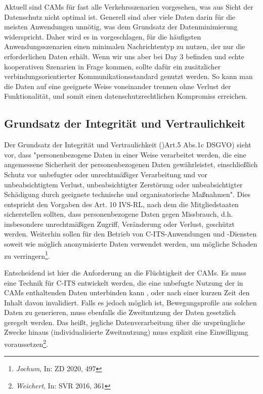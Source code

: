 Aktuell sind CAMs für fast alle Verkehrsszenarien vorgesehen, was aus Sicht der Datenschutz nicht optimal ist. Generell sind aber viele Daten darin für die meisten Anwendungen unnötig, was dem Grundsatz der Datenminimierung widerspricht. Daher wird es in \cite{Kiometzis2017} vorgeschlagen, für die häufigsten Anwendungsszenarien einen minimalen Nachrichtentyp zu nutzen, der nur die erforderlichen Daten erhält. Wenn wir uns aber bei Day 3 befinden und echte kooperativen Szenarien in Frage kommen, sollte dafür ein zusätzlicher verbindungsorientierter Kommunikationsstandard genutzt werden. So kann man die Daten auf eine geeignete Weise voneinander trennen ohne Verlust der Funktionalität, und somit einen datenschutzrechtlichen Kompromiss erreichen.

\subsection{Grundsatz der Integrität und Vertraulichkeit}

Der Grundsatz der Integrität und Vertraulichkeit ()Art.5 Abs.1c DSGVO) sieht vor, dass "personenbezogene Daten in einer Weise verarbeitet werden, die eine angemessene Sicherheit der personenbezogenen Daten gewährleistet, einschließlich Schutz vor unbefugter oder unrechtmäßiger Verarbeitung und vor unbeabsichtigtem Verlust, unbeabsichtigter Zerstörung oder unbeabsichtigter Schädigung durch geeignete technische und organisatorische Maßnahmen". Dies entspricht den Vorgaben des Art. 10 IVS-RL, nach dem die Mitgliedstaaten sicherstellen sollten, dass personenbezogene Daten gegen Missbrauch, d.h. insbesondere unrechtmäßigen Zugriff, Veränderung oder Verlust, geschützt werden. Weiterhin sollen für den Betrieb von C-ITS-Anwendungen und -Diensten soweit wie möglich anonymisierte Daten verwendet werden, um mögliche Schaden zu verringern\footnote{\emph{Jochum}, In: ZD 2020, 497}. 

Entscheidend ist hier die Anforderung an die Flüchtigkeit der CAMs. Es muss eine Technik für C-ITS entwickelt werden, die eine unbefugte Nutzung der in CAMs enthaltenden Daten unterbinden kann \cite{Kiometzis2017}, oder nach einer kurzen Zeit den Inhalt davon invalidiert. Falls es jedoch möglich ist, Bewegungsprofile aus solchen Daten zu generieren, muss ebenfalls die Zweitnutzung der Daten gesetzlich geregelt werden. Das heißt, jegliche Datenverarbeitung über die ursprüngliche Zwecke hinaus (individualisierte Zweitnutzung) muss explizit eine Einwilligung voraussetzen\footnote{\emph{Weichert}, In: SVR 2016, 361}.

